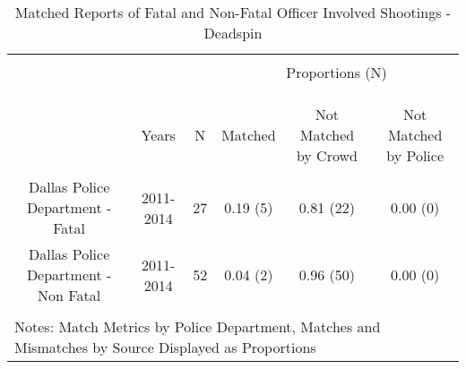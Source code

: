 
\begin{table}[!htbp] \centering 
  \caption{Matched Reports of Fatal and Non-Fatal Officer Involved Shootings - Deadspin} 
  \label{} 
\footnotesize 
\begin{tabular}{@{\extracolsep{5pt}} cccccc} 
\\[-1.8ex]\hline 
\hline \\[-1.8ex] 
 &&& \multicolumn{3}{c}{Proportions (N)} \\ \cline{4-6} \\[-4.8ex]  \\
\hline \\[-1.8ex] 
 & Years & N & Matched & Not Matched by Crowd & Not Matched by Police \\ 
\hline \\[-1.8ex] 
Dallas Police Department - Fatal & 2011-2014 & 27 & 0.19 (5) & 0.81 (22) & 0.00 (0) \\ 
Dallas Police Department - Non Fatal & 2011-2014 & 52 & 0.04 (2) & 0.96 (50) & 0.00 (0) \\ 
\hline \\[-1.8ex] 
\multicolumn{6}{l}{Notes: Match Metrics by Police Department, Matches and Mismatches by Source Displayed as Proportions} \\ 
\end{tabular} 
\end{table}  
